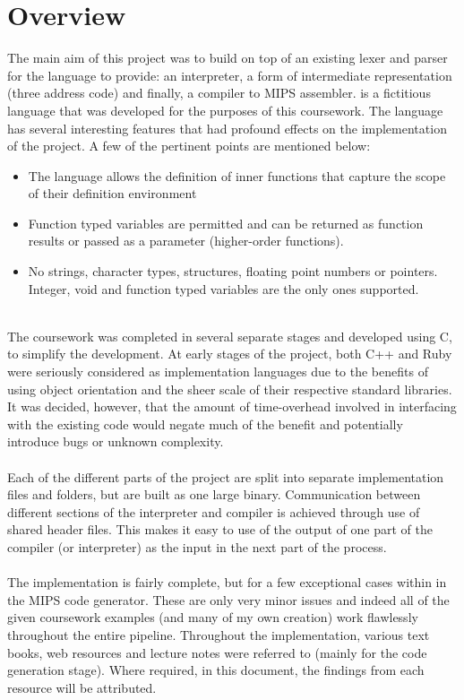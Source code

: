 \chapter{Overview}

The main aim of this project was to build on top of an existing lexer and parser for the \mmc language to provide: an interpreter, a form of intermediate representation (three address code) and finally, a compiler to MIPS assembler. \mmc is a fictitious language that was developed for the purposes of this coursework. The language has several interesting features that had profound effects on the implementation of the project. A few of the pertinent points are mentioned below:

\begin{itemize}
	\item The language allows the definition of inner functions that capture the scope of their definition environment
	\item Function typed variables are permitted and can be returned as function results or passed as a parameter (higher-order functions).
	\item No strings, character types, structures, floating point numbers or pointers. Integer, void and function typed variables are the only ones supported.
\end{itemize}
\vspace{-0.25cm}\ \\
The coursework was completed in several separate stages and developed using C, to simplify the development. At early stages of the project, both C++ and Ruby were seriously considered as implementation languages due to the benefits of using object orientation and the sheer scale of their respective standard libraries. It was decided, however, that the amount of time-overhead involved in interfacing with the existing code would negate much of the benefit and potentially introduce bugs or unknown complexity.
\ \\ \ \\
Each of the different parts of the project are split into separate implementation files and folders, but are built as one large binary. Communication between different sections of the interpreter and compiler is achieved through use of shared header files. This makes it easy to use of the output of one part of the compiler (or interpreter) as the input in the next part of the process.
\ \\ \ \\
The implementation is fairly complete, but for a few exceptional cases within in the MIPS code generator. These are only very minor issues and indeed all of the given coursework examples (and many of my own creation) work flawlessly throughout the entire pipeline. Throughout the implementation, various text books, web resources and lecture notes were referred to (mainly for the code generation stage). Where required, in this document, the findings from each resource will be attributed.

